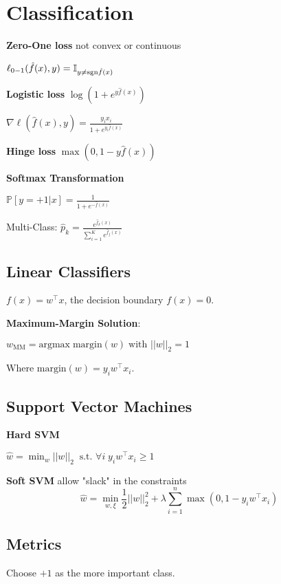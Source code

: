 \section*{Classification}

\textbf{Zero-One loss} \quad not convex or continuous

\qquad \qquad $\ell_{0-1}(\hat{f}(x), y) = \mathbb{I}_{y \neq \text{sgn} \hat{f}(x)}$

\textbf{Logistic loss} \quad $\log(1 + e^{y \hat{f}(x)})$

\qquad \qquad $\nabla \ell(\hat{f}(x), y) = \frac{y_i x_i}{1 + e^{y_i \hat{f}(x)}}$

\textbf{Hinge loss} \quad $\max(0, 1-y \hat{f}(x))$ \smallskip

\textbf{Softmax Transformation} 

\qquad \qquad $\mathbb{P}[y = +1 | x] = \frac{1}{1 + e^{- \hat{f}(x)}}$

Multi-Class: $\hat{p}_k = \frac{e^{\hat{f}_k(x)}}{\sum_{i=1}^K e^{\hat{f}_j(x)}}$

\subsection*{Linear Classifiers}

$f(x) = w^\top x$, the decision boundary $f(x) = 0$. \smallskip

\textbf{Maximum-Margin Solution}:

\quad $w_\text{MM} = \text{argmax} \; \text{margin} (w) \; \text{with } ||w||_2 = 1$

Where $\text{margin} (w) = y_i w^\top x_i$.
 
\subsection*{Support Vector Machines}
\textbf{Hard SVM}

\qquad $\hat{w} = \min_w ||w||_2 \; \; \text{s.t. } \forall i \;y_i w^\top x_i \geq 1$
 
\textbf{Soft SVM} \quad allow "slack" in the constraints
$$\hat{w} = \min_{w, \xi} \frac{1}{2} ||w||_2^2 + \lambda \sum_{i=1}^n \max (0, 1 - y_i w^\top x_i)$$

\subsection*{Metrics} 
Choose $+1$ as the more important class. \\[-18pt]

